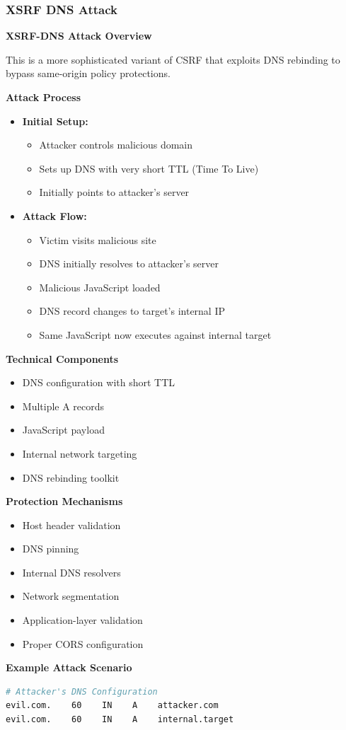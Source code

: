\subsubsection{XSRF DNS Attack}
\textbf{XSRF-DNS Attack Overview}

This is a more sophisticated variant of CSRF that exploits DNS rebinding to bypass same-origin policy protections.

\textbf{Attack Process}
\begin{itemize}
    \item \textbf{Initial Setup:}
        \begin{itemize}
            \item Attacker controls malicious domain
            \item Sets up DNS with very short TTL (Time To Live)
            \item Initially points to attacker's server
        \end{itemize}
    
    \item \textbf{Attack Flow:}
        \begin{itemize}
            \item Victim visits malicious site
            \item DNS initially resolves to attacker's server
            \item Malicious JavaScript loaded
            \item DNS record changes to target's internal IP
            \item Same JavaScript now executes against internal target
        \end{itemize}
\end{itemize}

\textbf{Technical Components}
\begin{itemize}
    \item DNS configuration with short TTL
    \item Multiple A records
    \item JavaScript payload
    \item Internal network targeting
    \item DNS rebinding toolkit
\end{itemize}

\textbf{Protection Mechanisms}
\begin{itemize}
    \item Host header validation
    \item DNS pinning
    \item Internal DNS resolvers
    \item Network segmentation
    \item Application-layer validation
    \item Proper CORS configuration
\end{itemize}

\textbf{Example Attack Scenario}
\begin{lstlisting}[language=bash]
# Attacker's DNS Configuration
evil.com.    60    IN    A    attacker.com
evil.com.    60    IN    A    internal.target
\end{lstlisting}